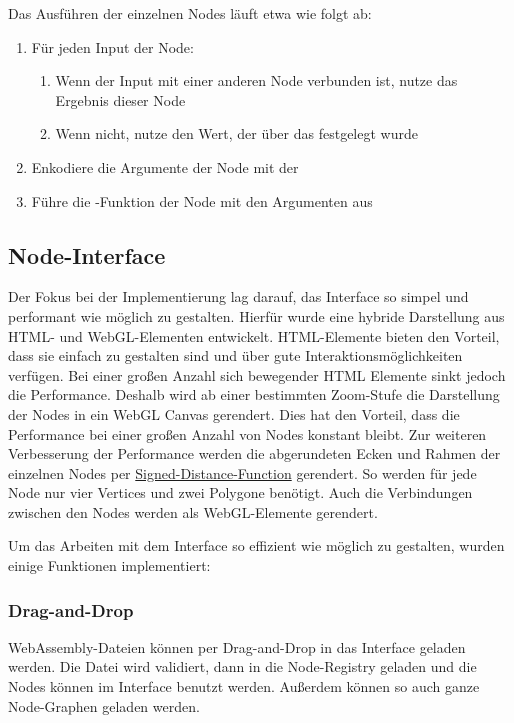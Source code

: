 \documentclass[ngerman]{article}
\begin{document}
Das Ausführen der einzelnen Nodes läuft etwa wie folgt ab:

\begin{enumerate}
  \item Für jeden Input der Node:
  \begin{enumerate}
      \item Wenn der Input mit einer anderen Node verbunden ist, nutze das Ergebnis dieser Node
      \item Wenn nicht, nutze den Wert, der über das  festgelegt wurde
  \end{enumerate}
  \item Enkodiere die Argumente der Node mit der 
  \item Führe die -Funktion der Node mit den Argumenten aus
\end{enumerate}

\subsection{Node-Interface}
Der Fokus bei der Implementierung lag darauf, das Interface so simpel und performant wie möglich zu gestalten. Hierfür wurde eine hybride Darstellung aus HTML- und WebGL-Elementen entwickelt. HTML-Elemente bieten den Vorteil, dass sie einfach zu gestalten sind und über gute Interaktionsmöglichkeiten verfügen. Bei einer großen Anzahl sich bewegender HTML Elemente sinkt jedoch die Performance. 
Deshalb wird ab einer bestimmten Zoom-Stufe die Darstellung der Nodes in ein WebGL Canvas gerendert. Dies hat den Vorteil, dass die Performance bei einer großen Anzahl von Nodes konstant bleibt. 
\br
Zur weiteren Verbesserung der Performance werden die abgerundeten Ecken und Rahmen der einzelnen Nodes per \href{https://en.wikipedia.org/wiki/Signed_distance_function}{Signed-Distance-Function} gerendert. So werden für jede Node nur vier Vertices und zwei Polygone benötigt. Auch die Verbindungen zwischen den Nodes werden als WebGL-Elemente gerendert.

\pagebreak

Um das Arbeiten mit dem Interface so effizient wie möglich zu gestalten, wurden einige Funktionen implementiert:

\subsubsection{Drag-and-Drop}
WebAssembly-Dateien können per Drag-and-Drop in das Interface geladen werden. Die Datei wird validiert, dann in die Node-Registry geladen und die Nodes können im Interface benutzt werden. Außerdem können so auch ganze Node-Graphen geladen werden.
\end{document}
